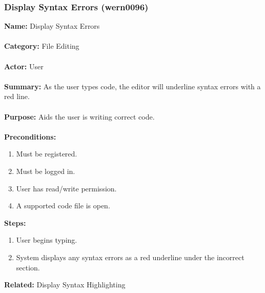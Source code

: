 \documentclass[11pt]{report}
\begin{document}
\subsubsection{Display Syntax Errors (wern0096)}
\begin{framed}
	\noindent\textbf{Name:} Display Syntax Errors \\ \\
	\textbf{Category:} File Editing \\ \\
	\textbf{Actor:} User \\ \\
	\textbf{Summary:} As the user types code, the editor will underline syntax errors with a red line. \\ \\
	\textbf{Purpose:} Aids the user is writing correct code. \\ \\
	\textbf{Preconditions:} 
	\begin{enumerate}
		\item Must be registered.
		\item Must be logged in.
		\item User has read/write permission.
		\item A supported code file is open.
	\end{enumerate}
	\textbf{Steps:}
	\begin{enumerate}
		\item User begins typing.
		\item System displays any syntax errors as a red underline under the incorrect section.
	\end{enumerate}
	\textbf{Related:} Display Syntax Highlighting
\end{framed}

\newpage
\end{document}
